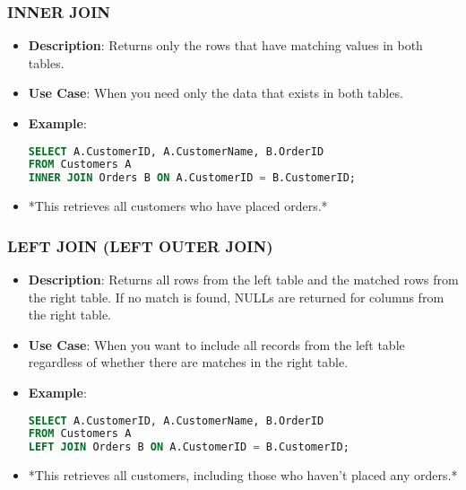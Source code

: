 \documentclass[aspectratio=169]{beamer}
\begin{document}
\begin{frame}[fragile]
    \frametitle{INNER JOIN}
    \begin{itemize}
        \item \textbf{Description}: Returns only the rows that have matching values in both tables.
        \item \textbf{Use Case}: When you need only the data that exists in both tables.
        \item \textbf{Example}:
        \begin{lstlisting}[language=SQL]
SELECT A.CustomerID, A.CustomerName, B.OrderID
FROM Customers A
INNER JOIN Orders B ON A.CustomerID = B.CustomerID;
        \end{lstlisting}
        \item *This retrieves all customers who have placed orders.*
    \end{itemize}
\end{frame}

\begin{frame}[fragile]
    \frametitle{LEFT JOIN (LEFT OUTER JOIN)}
    \begin{itemize}
        \item \textbf{Description}: Returns all rows from the left table and the matched rows from the right table. If no match is found, NULLs are returned for columns from the right table.
        \item \textbf{Use Case}: When you want to include all records from the left table regardless of whether there are matches in the right table.
        \item \textbf{Example}:
        \begin{lstlisting}[language=SQL]
SELECT A.CustomerID, A.CustomerName, B.OrderID
FROM Customers A
LEFT JOIN Orders B ON A.CustomerID = B.CustomerID;
        \end{lstlisting}
        \item *This retrieves all customers, including those who haven’t placed any orders.*
    \end{itemize}
\end{frame}
\end{document}
